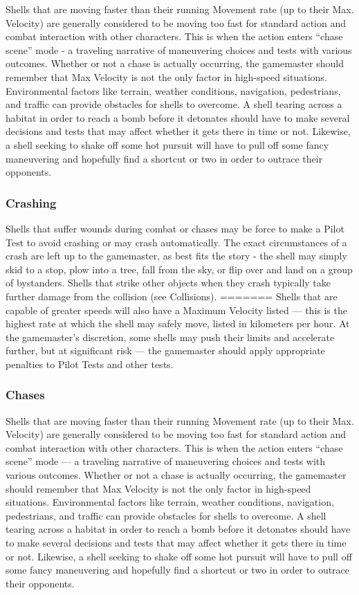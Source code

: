 Shells that are moving faster than their running Movement rate (up to their Max. Velocity) are generally considered to be moving too fast for standard action and combat interaction with other characters. This is when the action enters ``chase scene'' mode - a traveling narrative of maneuvering choices and tests with various outcomes. Whether or not a chase is actually occurring, the gamemaster should remember that Max Velocity is not the only factor in high-speed situations. Environmental factors like terrain, weather conditions, navigation, pedestrians, and traffic can provide obstacles for shells to overcome. A shell tearing across a habitat in order to reach a bomb before it detonates should have to make several decisions and tests that may affect whether it gets there in time or not. Likewise, a shell seeking to shake off some hot pursuit will have to pull off some fancy maneuvering and hopefully find a shortcut or two in order to outrace their opponents.

\subsubsection{Crashing}

Shells that suffer wounds during combat or chases may be force to make a Pilot Test to avoid crashing or may crash automatically. The exact circumstances of a crash are left up to the gamemaster, as best fits the story - the shell may simply skid to a stop, plow into a tree, fall from the sky, or flip over and land on a group of bystanders. Shells that strike other objects when they crash typically take further damage from the collision (see Collisions).
=======
Shells that are capable of greater speeds will also have a Maximum Velocity listed --- this is the highest rate at which the shell may safely move, listed in kilometers per hour. At the gamemaster’s discretion, some shells may push their limits and accelerate further, but at significant risk --- the gamemaster should apply appropriate penalties to Pilot Tests and other tests.

\subsubsection{Chases}

Shells that are moving faster than their running Movement rate (up to their Max. Velocity) are generally considered to be moving too fast for standard action and combat interaction with other characters. This is when the action enters ``chase scene'' mode --- a traveling narrative of maneuvering choices and tests with various outcomes. Whether or not a chase is actually occurring, the gamemaster should remember that Max Velocity is not the only factor in high-speed situations. Environmental factors like terrain, weather conditions, navigation, pedestrians, and traffic can provide obstacles for shells to overcome. A shell tearing across a habitat in order to reach a bomb before it detonates should have to make several decisions and tests that may affect whether it gets there in time or not. Likewise, a shell seeking to shake off some hot pursuit will have to pull off some fancy maneuvering and hopefully find a shortcut or two in order to outrace their opponents.

